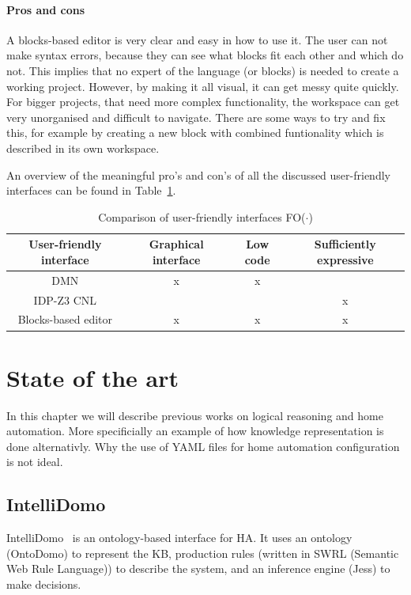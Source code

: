 \documentclass[11pt,a4paper]{report}
\newcommand{\fodot}{FO($\cdot$)\xspace}
\begin{document}
\paragraph{Pros and cons}
A blocks-based editor is very clear and easy in how to use it. The user can not make syntax errors, because they can see what blocks fit each other and which do not. This implies that no expert of the language (or blocks) is needed to create a working project. However, by making it all visual, it can get messy quite quickly. For bigger projects, that need more complex functionality, the workspace can get very unorganised and difficult to navigate. There are some ways to try and fix this, for example by creating a new block with combined funtionality which is described in its own workspace. 

An overview of the meaningful pro's and con's of all the discussed user-friendly interfaces can be found in Table~\ref{tab:user-friendly_comparison}.

\begin{table}
    \centering
    \caption{Comparison of user-friendly interfaces \fodot}
    \label{tab:user-friendly_comparison}
    \begin{tabular}{|c|c|c|c|}
    \hline
    User-friendly interface & Graphical interface & Low code & Sufficiently expressive \\ \hline
    DMN & x & x &   \\ \hline
    IDP-Z3 CNL &  &  & x  \\ \hline
    Blocks-based editor & x & x & x \\ \hline
    \end{tabular}
\end{table}

\section{State of the art}
In this chapter we will describe previous works on logical reasoning and home automation. More specificially an example of how knowledge representation is done alternativly. Why the use of YAML files for home automation configuration is not ideal.

\subsection{IntelliDomo}
IntelliDomo~\cite{SOTA_OntologyBased} is an ontology-based interface for HA. It uses an ontology (OntoDomo) to represent the KB, production rules (written in SWRL (Semantic Web Rule Language)) to describe the system, and an inference engine (Jess) to make decisions.
\end{document}
